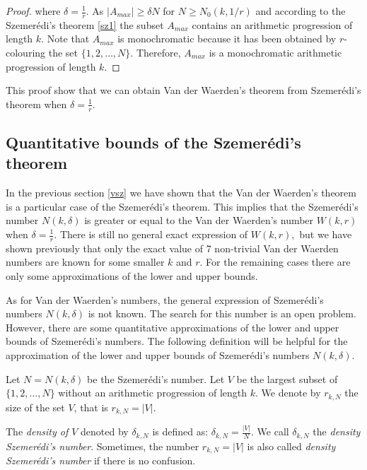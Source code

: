 \begin{proof}
where $\delta = \frac{1}{r}$.
As $|A_{max}| \geq \delta N$ for $N \ge N_0(k, 1/r)$ and according to the Szemerédi's theorem \eqref{sz1} the subset $A_{max}$  contains an arithmetic progression of length $k.$
Note that $A_{max}$ is monochromatic because it has been obtained by $r$-colouring the set $\{1,2,\ldots, N\}.$ Therefore, $A_{max}$ is a monochromatic arithmetic progression of length $k.$
\end{proof}
This proof show that we can obtain Van der Waerden's theorem from   Szemerédi's theorem when $\delta= \frac{1}{r}.$


\subsection{Quantitative bounds of the  Szemerédi's theorem}

In the previous section \eqref{vsz} we have shown that the Van der Waerden's theorem is a particular case of the Szemerédi's theorem. This implies that the Szemerédi's number $N(k, \delta)$ is greater or equal to the Van der Waerden's number $W(k,r)$ when $\delta=\frac{1}{r}.$
There is still no  general exact expression of $W(k,r),$ but  we have shown previously that only the exact value of 7 non-trivial Van der Waerden numbers are known for some smaller $k$ and $r$. For the remaining cases there are only some  approximations of the lower and upper bounds. 

As for  Van der Waerden's numbers,  the general expression of Szemerédi's numbers $N(k, \delta)$ is not known. The search for this number is an open problem. However, there are some quantitative approximations of the lower and upper bounds of  Szemerédi's numbers.  The following definition will be helpful for the approximation of the lower and upper bounds of Szemerédi's numbers $N(k, \delta)$.

\begin{defn} Let $N=N(k, \delta)$ be the Szemerédi's number. Let $V$ be the largest subset of $\{1,2,\ldots, N \}$ without an arithmetic progression of length $k.$ We denote by $r_{k,N}$ the size of the set $V$, that is  $r_{k,N}= |V|.$

The \textit{density of $V$} denoted by $\delta_{k,N}$ is defined as: $\delta_{k,N}=\frac{|V|}{N}.$ We call  $\delta_{k,N}$ the \textit{density Szemerédi's number}. Sometimes, the number $r_{k,N}= |V|$ is also called \textit{density Szemerédi's number} if there is no confusion.
\end{defn}

